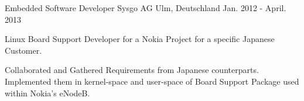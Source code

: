   \cventry
    {Embedded Software Developer} %
    {Sysgo AG} %
    {Ulm, Deutschland} %
    {Jan. 2012 - April. 2013} %
    {
      \begin{cvitems} %
    \item {Linux Board Support Developer for a Nokia Project for a specific Japanese Customer.}
	\item {Collaborated and Gathered Requirements from Japanese counterparts. Implemented them in kernel-space and user-space of Board Support Package  used within Nokia's eNodeB.}
       \end{cvitems}
    }
